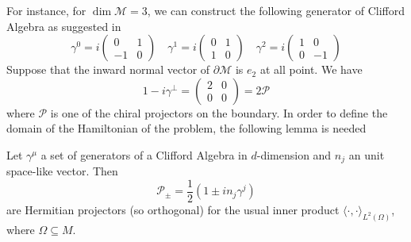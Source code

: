 For instance, for $\dim \mathcal{M} = 3$, we can construct the following generator of Clifford Algebra as suggested in~\cite{Polchinski1998}
\begin{equation*}
\gamma^0 = i\begin{pmatrix} 0 & 1 \\ -1 & 0 \end{pmatrix}  \quad
\gamma^1 = i\begin{pmatrix} 0 & 1 \\ 1 & 0 \end{pmatrix}  \quad
\gamma^2 = i\begin{pmatrix} 1 & 0 \\ 0 & -1 \end{pmatrix}  
\end{equation*}
Suppose that the inward normal vector of $\partial \mathcal{M}$ is $e_2$ at all point.
We have
\begin{equation*}
1 - i\gamma^\bot = 
\begin{pmatrix} 2 & 0 \\ 0 & 0\end{pmatrix} = 2 \mathcal{P}
\end{equation*}
where $\mathcal{P}$ is one of the chiral projectors on the boundary. 
In order to define the domain of the Hamiltonian of the problem, the following lemma is needed 
\begin{lemma}\label{wen-proj}
Let $\gamma^\mu$ a set of generators of a Clifford Algebra in $d$-dimension and $n_j$ an unit space-like vector.
Then
\begin{equation*}
\mathcal{P}_\pm = \frac{1}{2}(1 \pm i n_j\gamma^j) 
\end{equation*}
are Hermitian projectors (so orthogonal) for the usual inner product $\langle \cdot, \cdot \rangle _{L^2(\Omega)}$, where $\Omega\subseteq M$.
\end{lemma}
